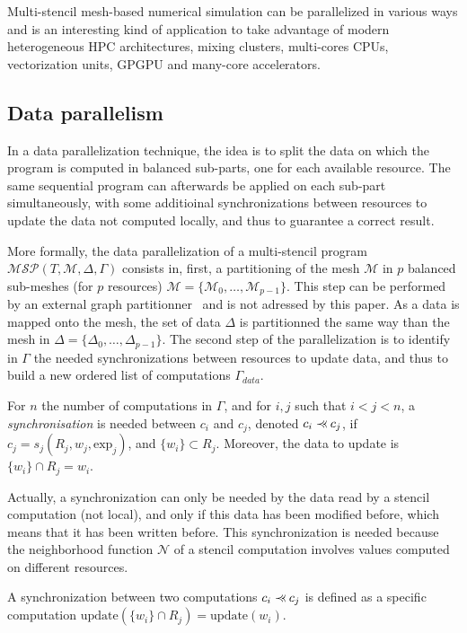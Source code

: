 Multi-stencil mesh-based numerical simulation can be parallelized in various ways and is an interesting kind of application to take advantage of modern heterogeneous HPC architectures, mixing clusters, multi-cores CPUs, vectorization units, GPGPU and many-core accelerators.

\subsection{Data parallelism}
\label{sect:dataparal}
In a data parallelization technique, the idea is to split the data on which the program is computed in balanced sub-parts, one for each available resource. The same sequential program can afterwards be applied on each sub-part simultaneously, with some additioinal synchronizations between resources to update the data not computed locally, and thus to guarantee a correct result.

More formally, the data parallelization of a multi-stencil program $\mathcal{MSP}(T,\mathcal{M},\Delta,\Gamma)$ consists in, first, a partitioning of the mesh $\mathcal{M}$ in $p$ balanced sub-meshes (for $p$ resources) $\mathcal{M}=\{\mathcal{M}_0,\dots,\mathcal{M}_{p-1}\}$. This step can be performed by an external graph partitionner~\cite{} and is not adressed by this paper. As a data is mapped onto the mesh, the set of data $\Delta$ is partitionned the same way than the mesh in $\Delta=\{\Delta_0,\dots,\Delta_{p-1}\}$. The second step of the parallelization is to identify in $\Gamma$ the needed synchronizations between resources to update data, and thus to build a new ordered list of computations $\Gamma_{data}$.

\begin{mydef}
For $n$ the number of computations in $\Gamma$, and for $i,j$ such that $i<j<n$, a \textit{synchronisation} is needed between $c_i$ and $c_j$, denoted $c_i \pprec c_j$, if $c_j=s_j(R_j,w_j,\text{exp}_j)$, and $\{w_i\} \subset R_j$. Moreover, the data to update is $\{w_i\} \cap R_j = w_i$.
\end{mydef}

Actually, a synchronization can only be needed by the data read by a stencil computation (not local), and only if this data has been modified before, which means that it has been written before. This synchronization is needed because the neighborhood function $\mathcal{N}$ of a stencil computation involves values computed on different resources.

\begin{mydef}
A synchronization between two computations $c_i \pprec c_j$ is defined as a specific computation $\text{update}(\{w_i\} \cap R_j)=\text{update}(w_i)$.
\end{mydef}

